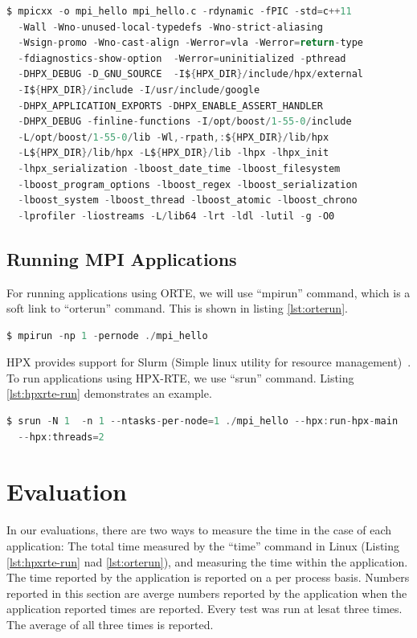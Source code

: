 \begin{lstlisting}[language=C, frame=single, basicstyle=\footnotesize, caption=Compile Line for Hello World\label{lst:compile}]
  $ mpicxx -o mpi_hello mpi_hello.c -rdynamic -fPIC -std=c++11
  -Wall -Wno-unused-local-typedefs -Wno-strict-aliasing
  -Wsign-promo -Wno-cast-align -Werror=vla -Werror=return-type
  -fdiagnostics-show-option  -Werror=uninitialized -pthread
  -DHPX_DEBUG -D_GNU_SOURCE  -I${HPX_DIR}/include/hpx/external
  -I${HPX_DIR}/include -I/usr/include/google
  -DHPX_APPLICATION_EXPORTS -DHPX_ENABLE_ASSERT_HANDLER
  -DHPX_DEBUG -finline-functions -I/opt/boost/1-55-0/include
  -L/opt/boost/1-55-0/lib -Wl,-rpath,:${HPX_DIR}/lib/hpx
  -L${HPX_DIR}/lib/hpx -L${HPX_DIR}/lib -lhpx -lhpx_init
  -lhpx_serialization -lboost_date_time -lboost_filesystem
  -lboost_program_options -lboost_regex -lboost_serialization
  -lboost_system -lboost_thread -lboost_atomic -lboost_chrono
  -lprofiler -liostreams -L/lib64 -lrt -ldl -lutil -g -O0
\end{lstlisting}

\subsection{Running MPI Applications}
For running applications using ORTE, we will use ``mpirun'' command, which is a soft link to ``orterun'' command. This is shown in listing \ref{lst:orterun}.

\begin{lstlisting}[language=C, frame=single, basicstyle=\footnotesize, caption=Running MPI Applications Using ORTE \label{lst:orterun}]
$ mpirun -np 1 -pernode ./mpi_hello
\end{lstlisting}

HPX provides support for Slurm (Simple linux utility for resource management)~\cite{yoo2003slurm}. To run applications using HPX-RTE, we use ``srun'' command. Listing \ref{lst:hpxrte-run} demonstrates an example.

\begin{lstlisting}[language=C, frame=single, basicstyle=\footnotesize, caption=Running MPI Applications Using HPX-RTE \label{lst:hpxrte-run}]
$ srun -N 1  -n 1 --ntasks-per-node=1 ./mpi_hello --hpx:run-hpx-main
  --hpx:threads=2
\end{lstlisting}


\section{Evaluation}
In our evaluations, there are two ways to measure the time in the case of each application: The total time measured by the ``time'' command in Linux (Listing \ref{lst:hpxrte-run} nad \ref{lst:orterun}), and measuring the time within the application. The time reported by the application is reported on a per process basis. Numbers reported in this section are averge numbers reported by the application when the application reported times are reported. Every test was run at lesat three times. The average of all three times is reported.


